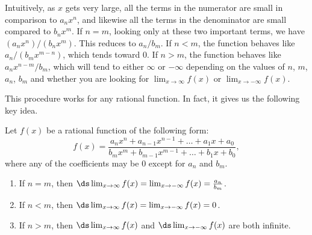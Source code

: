 Intuitively, as $x$ gets very large, all the terms in the numerator are small in comparison to $a_nx^n$, and likewise all the terms in the denominator are small compared to $b_nx^m$.  If $n=m$, looking only at these two important terms, we have $(a_nx^n)/(b_nx^m)$.  This reduces to $a_n/b_m$.  If $n<m$, the function behaves like $a_n/(b_mx^{m-n})$, which tends toward 0.  If $n>m$, the function behaves like $a_nx^{n-m}/b_m$, which will tend to either $\infty$ or $-\infty$ depending on the values of $n$, $m$, $a_n$, $b_m$ and whether you are looking for $\lim_{x\rightarrow\infty} f(x)$ or $\lim_{x\rightarrow-\infty} f(x)$.

This procedure works for any rational function.  In fact, it gives us the following key idea.

\begin{keyidea}\label{thm:lim_rational_fn_at_infty}
Let $f(x)$ be a rational function of the following form:
\[f(x)=\frac{a_nx^n + a_{n-1}x^{n-1}+\dots + a_1x + a_0}{b_mx^m + b_{m-1}x^{m-1} + \dots + b_1x + b_0},\]
where any of the coefficients may be 0 except for $a_n$ and $b_m$.
\begin{enumerate}
\item If $n=m$, then $\ds\lim_{x\rightarrow\infty} f(x) = \lim_{x\rightarrow-\infty} f(x) = \frac{a_n}{b_m}$.
\item If $n<m$, then $\ds\lim_{x\rightarrow\infty} f(x) = \lim_{x\rightarrow-\infty} f(x) = 0$.
\item If $n>m$, then $\ds\lim_{x\rightarrow\infty} f(x)$ and $\ds\lim_{x\to-\infty} f(x)$ are both infinite.
\end{enumerate}
\end{keyidea}


